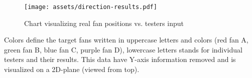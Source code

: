 \begin{figure}[h]{}
\centering\texttt{[image: assets/direction-results.pdf]}
\caption{Chart visualizing real fan positions vs. testers input}
\end{figure}

Colors define the target fans written in uppercase letters and colors
(red fan A, green fan B, blue fan C, purple fan D),
lowercase letters stands for individual testers and their results. This data
have Y-axis information removed and is visualized on a 2D-plane
(viewed from top).